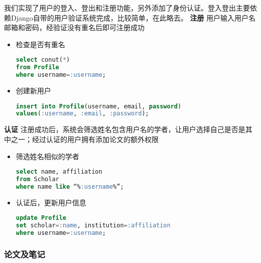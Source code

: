 我们实现了用户的登入、登出和注册功能，另外添加了身份认证。登入登出主要依赖Django自带的用户验证系统完成，比较简单，在此略去。
\noindent
{\bf 注册} 用户输入用户名邮箱和密码，经验证没有重名后即可注册成功
\begin{itemize}
\item 检查是否有重名
\begin{lstlisting}[language=SQL]
select conut(*)
from Profile
where username=:username;
\end{lstlisting}
\item 创建新用户
\begin{lstlisting}[language=SQL]
insert into Profile(username, email, password)
values(:username, :email, :password);
\end{lstlisting}
\end{itemize}
{\bf 认证} 注册成功后，系统会筛选姓名包含用户名的学者，让用户选择自己是否是其中之一；经过认证的用户拥有添加论文的额外权限
\begin{itemize}
\item 筛选姓名相似的学者
\begin{lstlisting}[language=SQL]
select name, affiliation
from Scholar
where name like “%:username%”;
\end{lstlisting}
\item 认证后，更新用户信息
\begin{lstlisting}[language=SQL]
update Profile
set scholar=:name, institution=:affiliation
where username=:username;
\end{lstlisting}
\end{itemize}

\subsubsection{论文及笔记}

